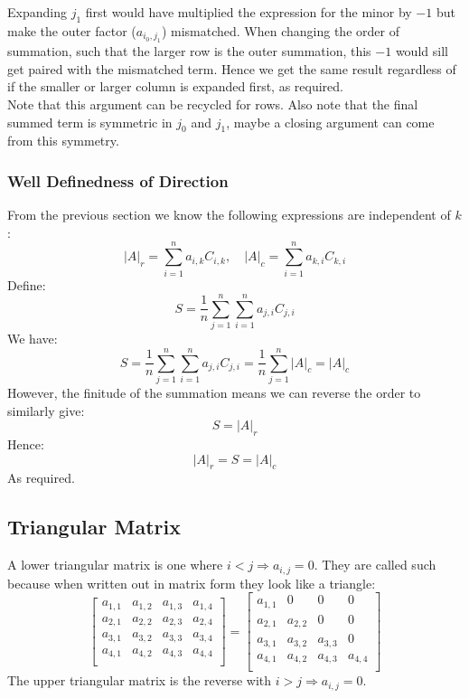 Expanding $j_1$ first would have multiplied the expression for the minor by $-1$ but make the outer factor ($a_{i_0,j_1}$) mismatched.
When changing the order of summation,
such that the larger row is the outer summation,
this $-1$ would sill get paired with the mismatched term.
Hence we get the same result regardless of if the smaller or larger column is expanded first,
as required.
\\

Note that this argument can be recycled for rows.
Also note that the final summed term is symmetric in $j_0$ and $j_1$,
maybe a closing argument can come from this symmetry.

\subsubsection{Well Definedness of Direction}
From the previous section we know the following expressions are independent of $k$:
\[|A|_r = \sum_{i=1}^na_{i,k}C_{i,k},\quad |A|_c = \sum_{i=1}^na_{k,i}C_{k,i}\]
Define:
\[S=\frac{1}{n}\sum_{j=1}^n\sum_{i=1}^na_{j,i}C_{j,i}\]
We have:
\[S=\frac{1}{n}\sum_{j=1}^n\sum_{i=1}^na_{j,i}C_{j,i} = \frac{1}{n}\sum_{j=1}^{n}|A|_c = |A|_c\]
However, the finitude of the summation means we can reverse the order to similarly give:
\[S=|A|_r\]
Hence:
\[|A|_r = S = |A|_c\]
As required.

\subsection{Triangular Matrix}
A lower triangular matrix is one where $i<j \Rightarrow a_{i,j} = 0$.
They are called such because when written out in matrix form they look like a triangle:
\[\begin{bmatrix}
	a_{1,1}&a_{1,2}&a_{1,3}&a_{1,4} \\
	a_{2,1}&a_{2,2}&a_{2,3}&a_{2,4} \\
	a_{3,1}&a_{3,2}&a_{3,3}&a_{3,4} \\
	a_{4,1}&a_{4,2}&a_{4,3}&a_{4,4} \\
\end{bmatrix} =
\begin{bmatrix}
	a_{1,1}&0&0&0 \\
	a_{2,1}&a_{2,2}&0&0 \\
	a_{3,1}&a_{3,2}&a_{3,3}&0 \\
	a_{4,1}&a_{4,2}&a_{4,3}&a_{4,4} \\
\end{bmatrix}\]
The upper triangular matrix is the reverse with $i>j \Rightarrow a_{i,j} = 0$.
\\

